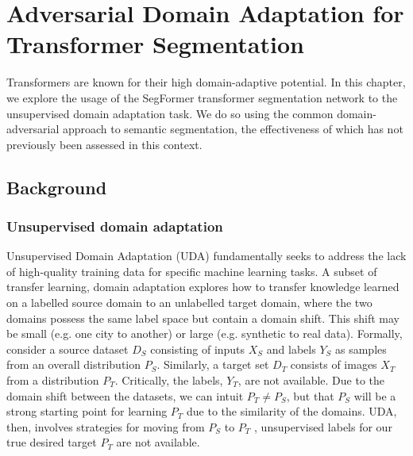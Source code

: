 \documentclass[a4paper,12pt]{report}
\begin{document}
\chapter{Adversarial Domain Adaptation for Transformer Segmentation}

Transformers are known for their high domain-adaptive potential. In this chapter, we explore the usage of the SegFormer \cite{xie_segformer_2021} transformer segmentation network to the unsupervised domain adaptation task. We do so using the common domain-adversarial approach to semantic segmentation, the effectiveness of which has not previously been assessed in this context.

\section{Background}

\subsection{Unsupervised domain adaptation}
Unsupervised Domain Adaptation (UDA) fundamentally seeks to address the lack of high-quality training data for specific machine learning tasks. A subset of transfer learning, domain adaptation explores how to transfer knowledge learned on a labelled source domain to an unlabelled target domain, where the two domains possess the same label space but contain a domain shift. This shift may be small (e.g. one city to another) or large (e.g. synthetic to real data). Formally, consider a source dataset $D_S$ consisting of inputs $X_S$ and labels $Y_S$ as samples from an overall distribution $P_S$. Similarly, a target set $D_T$ consists of images $X_T$ from a distribution $P_T$. Critically, the labels, $Y_T$, are not available. Due to the domain shift between the datasets, we can intuit $P_T \neq P_S$, but that $P_S$ will be a strong starting point for learning $P_T$ due to the similarity of the domains. UDA, then, involves strategies for moving from $P_S$ to $P_T$ \cite{wilson_survey_2020}, unsupervised labels for our true desired target $P_T$ are not available.
\end{document}
